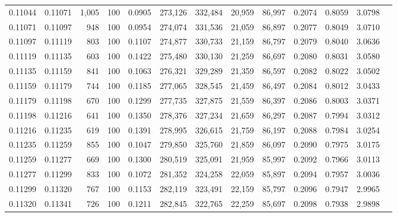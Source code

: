 \begin{tabular}{rrrrrrrrrrrrr}
0.11044 & 0.11071 & 1,005 & 100 &                                     0.0905 & 273,126 & 332,484 &  20,959 &  86,997 & 0.2074 & 0.8059 & 3.0798 \\
0.11071 & 0.11097 &   948 & 100 &                                     0.0954 & 274,074 & 331,536 &  21,059 &  86,897 & 0.2077 & 0.8049 & 3.0710 \\
0.11097 & 0.11119 &   803 & 100 &                                     0.1107 & 274,877 & 330,733 &  21,159 &  86,797 & 0.2079 & 0.8040 & 3.0636 \\
0.11119 & 0.11135 &   603 & 100 &                                     0.1422 & 275,480 & 330,130 &  21,259 &  86,697 & 0.2080 & 0.8031 & 3.0580 \\
0.11135 & 0.11159 &   841 & 100 &                                     0.1063 & 276,321 & 329,289 &  21,359 &  86,597 & 0.2082 & 0.8022 & 3.0502 \\
0.11159 & 0.11179 &   744 & 100 &                                     0.1185 & 277,065 & 328,545 &  21,459 &  86,497 & 0.2084 & 0.8012 & 3.0433 \\
0.11179 & 0.11198 &   670 & 100 &                                     0.1299 & 277,735 & 327,875 &  21,559 &  86,397 & 0.2086 & 0.8003 & 3.0371 \\
0.11198 & 0.11216 &   641 & 100 &                                     0.1350 & 278,376 & 327,234 &  21,659 &  86,297 & 0.2087 & 0.7994 & 3.0312 \\
0.11216 & 0.11235 &   619 & 100 &                                     0.1391 & 278,995 & 326,615 &  21,759 &  86,197 & 0.2088 & 0.7984 & 3.0254 \\
0.11235 & 0.11259 &   855 & 100 &                                     0.1047 & 279,850 & 325,760 &  21,859 &  86,097 & 0.2090 & 0.7975 & 3.0175 \\
0.11259 & 0.11277 &   669 & 100 &                                     0.1300 & 280,519 & 325,091 &  21,959 &  85,997 & 0.2092 & 0.7966 & 3.0113 \\
0.11277 & 0.11299 &   833 & 100 &                                     0.1072 & 281,352 & 324,258 &  22,059 &  85,897 & 0.2094 & 0.7957 & 3.0036 \\
0.11299 & 0.11320 &   767 & 100 &                                     0.1153 & 282,119 & 323,491 &  22,159 &  85,797 & 0.2096 & 0.7947 & 2.9965 \\
0.11320 & 0.11341 &   726 & 100 &                                     0.1211 & 282,845 & 322,765 &  22,259 &  85,697 & 0.2098 & 0.7938 & 2.9898 \\

\end{tabular}
